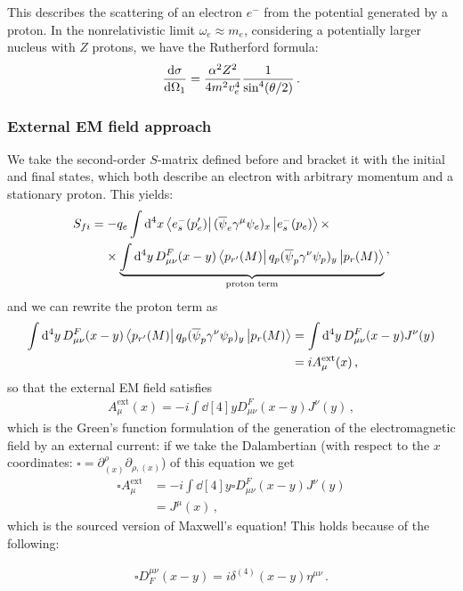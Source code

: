 \documentclass[main.tex]{subfiles}
\begin{document}
This describes the scattering of an electron \(e^{-}\) from the potential generated by a proton. In the nonrelativistic limit \(\omega_{e} \approx m_e\), considering a potentially larger nucleus with \(Z\) protons, we have the Rutherford formula: 
%
\begin{align}
\dv{\sigma }{\Omega_1} = \frac{\alpha^2Z^2}{4 m^2 v_e^{4}}
\frac{1}{\sin^{4} (\theta /2)}
\,.
\end{align}

\subsubsection{External EM field approach}

We take the second-order \(S\)-matrix defined before and bracket it with the initial and final states, which both describe an electron with arbitrary momentum and a stationary proton. This yields: 
%
\begin{align}
\begin{split}
S_{fi} &= - q_e \int \dd[4]{x}
\bra{e^{-}_{s} (p'_e)} 
(\overline{\psi}_{e} \gamma^{\mu} \psi_{e})_x 
\ket{e^{-}_{s}(p_e)} \times\\
&\phantom{=}\ \times
\underbrace{\int \dd[4]{y} D^{F}_{\mu \nu } (x-y) 
\bra{p_{r'} (M)} q_p  
(\overline{\psi}_{p} \gamma^{\nu} \psi_{p})_y 
\ket{p_r (M)}}_{\text{proton term}}
\end{split}
\,,
\end{align}
%
and we can rewrite the proton term as 
%
\begin{align}
\int \dd[4]{y} D^{F}_{\mu \nu } (x-y) 
\bra{p_{r'} (M)} q_p  
(\overline{\psi}_{p} \gamma^{\nu} \psi_{p})_y 
\ket{p_r (M)}
&= \int \dd[4]{y} D^{F}_{\mu \nu } (x-y) J^{\nu }(y)  \\
&= i A_{\mu }^{ \text{ext}}(x)
\,,
\end{align}
%
so that the external EM field satisfies 
%
\begin{align}
A_{\mu }^{ \text{ext}}(x)
=-i \int \dd[4]{y} D^{F}_{\mu \nu } (x-y) J^{\nu }(y)
\,,
\end{align}
%
which is the Green's function formulation of the generation of the electromagnetic field by an external current: if we take the Dalambertian (with respect to the \(x\) coordinates: \(\square = \partial^{\rho }_{(x)} \partial_{\rho, (x)}\)) of this equation we get 
%
\begin{align}
\square A^{\text{ext}}_{\mu } &= -i 
\int \dd[4]{y} \square D^{F}_{\mu \nu } (x-y) J^{\nu }(y)  \\
&= J^{\mu }(x)
\,,
\end{align}
%
which is the sourced version of Maxwell's equation! This holds because of the following: 
\begin{claim}
\begin{align}
\square D^{\mu \nu }_{F} (x-y) = i \delta^{(4)} (x-y) \eta^{\mu \nu }
\,.
\end{align}
\end{claim}
\end{document}
